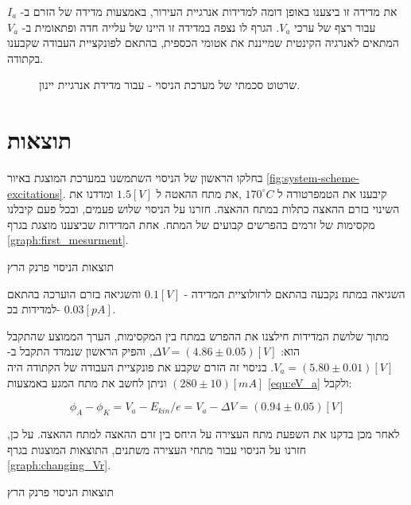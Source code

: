 \documentclass{article}
\begin{document}
את מדידה זו ביצענו באופן דומה למדידות אנרגיית העירור, באמצעות מדידה של הזרם ב-
$I_a$
עבור רצף של ערכי
$V_a$.
הגרף לו נצפה במדידה זו היינו של עלייה חדה ופתאומית ב-
$V_a$
המתאים לאנרגיה הקינטית שמייננת את אטומי הכספית, בהתאם לפונקציית העבודה שקבענו בקתודה.

\begin{figure}
   \centering
   \caption{
   שרטוט סכמתי של מערכת הניסוי - עבור מדידת אנרגיית יינון.
   }
   \label{fig:system-scheme-ionization}
\end{figure}

\clearpage

\section{תוצאות}
בחלקו הראשון של הניסוי השתמשנו במערכת המוצגת באיור
\ref{fig:system-scheme-excitations}.
קיבענו את הטמפרטורה ל
$170 ^{\circ} C$
,את מתח ההאטה ל
$1.5 [V]$
ומדדנו את השינוי בזרם ההאצה כתלות במתח ההאצה.
חזרנו על הניסוי שלוש פעמים, ובכל פעם קיבלנו מקסימות של זרמים בהפרשים קבועים של המתח.
אחת המדידות שביצענו מוצגת בגרף
\ref{graph:first_mesurment}.
 
\begin{graph}[H]
	\begin{center}
	\resizebox{\textwidth}{!}{}
	\end{center}
	\caption{תוצאות הניסוי פרנק הרץ}
\label{graph:first_mesurment}
\end{graph}

השגיאה במתח נקבעה בהתאם לרזולוציית המדידה - 
$0.1 [V]$
והשגיאה בזרם הוערכה בהתאם למדידות בכ- 
$0.03 [pA]$.

מתוך שלושת המדידות חילצנו את ההפרש במתח בין המקסימות, הערך הממוצע שהתקבל הוא:
$\Delta V = (4.86 \pm 0.05)[V]$,
והפיק הראשון שנמדד התקבל ב- 
$V_a = (5.80 \pm 0.01)[V]$.
בניסוי זה הזרם שקבע את פונקציית העבודה של הקתודה היה
$(280 \pm 10) [mA]$
וניתן לחשב את מתח המגע באמצעות
\ref{equ:eV_a}
ולקבל:

$$ \phi_A - \phi_K = V_a - E_{kin}/e = V_a - \Delta V = (0.94 \pm 0.05) [V]$$ 

לאחר מכן בדקנו את השפעת מתח העצירה על היחס בין זרם ההאצה למתח ההאצה.
על כן, חזרנו על הניסוי עבור מתחי העצירה משתנים, התוצאות המוצגות בגרף
\ref{graph:changing_Vr}.

\begin{graph}[H]
	\begin{center}
	\resizebox{\textwidth}{!}{}
	\end{center}
	\caption{תוצאות הניסוי פרנק הרץ}
	\label{graph:changing_Vr}
\end{graph}
\end{document}
